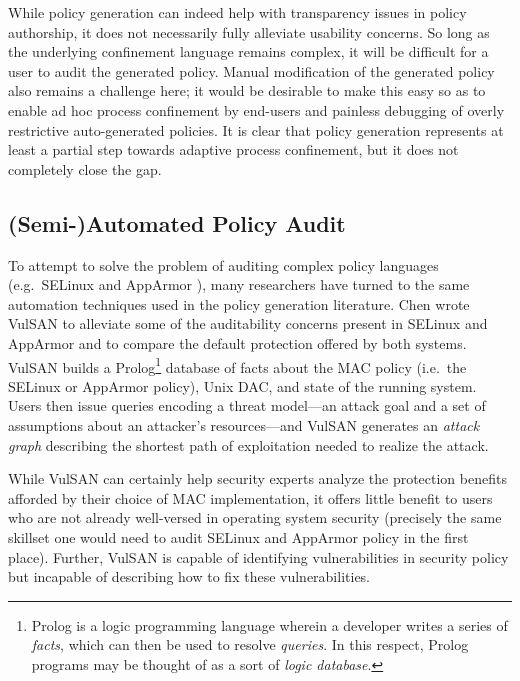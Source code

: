 \documentclass[dvipsnames, 12pt]{article}
\begin{document}
While policy generation can indeed help with transparency issues in policy
authorship, it does not necessarily fully alleviate usability concerns. So long
as the underlying confinement language remains complex, it will be difficult for
a user to audit the generated policy. Manual modification of the generated
policy also remains a challenge here; it would be desirable to make this easy so
as to enable ad hoc process confinement by end-users and painless debugging of
overly restrictive auto-generated policies. It is clear that policy generation
represents at least a partial step towards adaptive process confinement, but it
does not completely close the gap.

\subsection{(Semi-)Automated Policy Audit}

To attempt to solve the problem of auditing complex policy languages
(e.g.~SELinux \cite{smalley2001_selinux} and AppArmor
\cite{cowan2000_apparmor}), many researchers have turned to the same automation
techniques used in the policy generation literature. Chen \etal wrote VulSAN
\cite{chen09_vulsan} to alleviate some of the auditability concerns present in
SELinux and AppArmor and to compare the default protection offered by both
systems. VulSAN builds a Prolog\footnote{Prolog is a logic programming language
wherein a developer writes a series of \textit{facts}, which can then be used to
resolve \textit{queries}. In this respect, Prolog programs may be thought of as
a sort of \textit{logic database}.} database of facts about the MAC policy
(i.e.~the SELinux or AppArmor policy), Unix DAC, and state of the running
system. Users then issue queries encoding a threat model---an attack goal and
a set of assumptions about an attacker's resources---and VulSAN generates an
\textit{attack graph} describing the shortest path of exploitation needed to
realize the attack.

While VulSAN can certainly help security experts analyze the protection benefits
afforded by their choice of MAC implementation, it offers little benefit to
users who are not already well-versed in operating system security (precisely
the same skillset one would need to audit SELinux and AppArmor policy in the
first place). Further, VulSAN is capable of identifying vulnerabilities in
security policy but incapable of describing how to fix these vulnerabilities.
\end{document}
